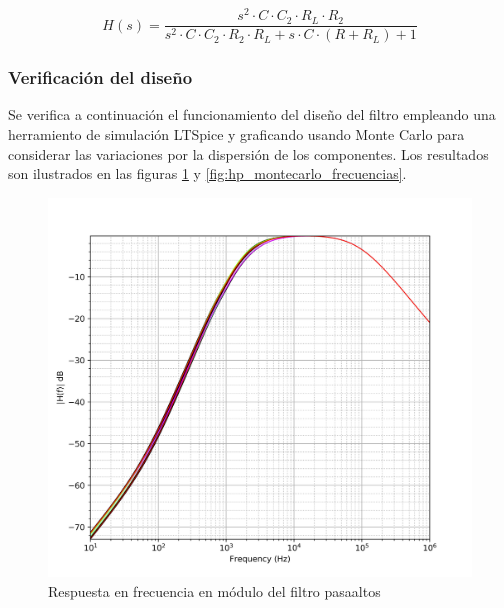 \begin{equation}
    H(s) = \frac{s^{2} \cdot C \cdot C_2 \cdot R_L \cdot R_2}{s^{2} \cdot C \cdot C_2 \cdot R_2 \cdot R_L + s \cdot C \cdot (R + R_L) + 1}
\end{equation}
 
\subsubsection{Verificaci\'on del dise\~no}
Se verifica a continuaci\'on el funcionamiento del dise\~no del filtro empleando una herramiento de simulaci\'on LTSpice y graficando usando Monte Carlo para considerar las variaciones
por la dispersi\'on de los componentes. Los resultados son ilustrados en las figuras \ref{fig:hp_montecarlo} y \ref{fig:hp_montecarlo_frecuencias}.

\begin{figure}[H]
    \centering
        \includegraphics[scale=0.12]{../EJ2/Recursos/hp_montecarlo.png}
    \caption{Respuesta en frecuencia en m\'odulo del filtro pasaaltos}
    \label{fig:hp_montecarlo}
\end{figure}

